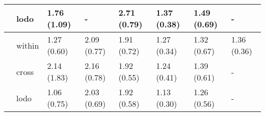 \begin{table*}
\begin{tabular}{llllllll}
       & lodo &  1.76 (1.09) &            - &  2.71 (0.79) &  1.37 (0.38) &  1.49 (0.69) &            - \\
\midrule
\midrule
       & within &  1.27 (0.60) &  2.09 (0.77) &  1.91 (0.72) &  1.27 (0.34) &  1.32 (0.67) &  1.36 (0.36) \\
       & cross  &  2.14 (1.83) &  2.16 (0.78) &  1.92 (0.55) &  1.24 (0.41) &  1.39 (0.61) &            - \\
       & lodo   &  1.06 (0.75) &  2.03 (0.69) &  1.92 (0.58) &  1.13 (0.30) &  1.26 (0.56) &            - \\
\bottomrule
\end{tabular}
\end{table*}
